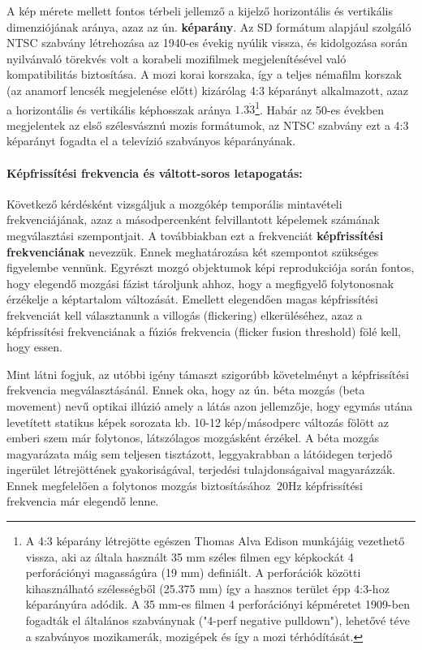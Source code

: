 A kép mérete mellett fontos térbeli jellemző a kijelző horizontális és vertikális dimenziójának aránya, azaz az ún. \textbf{képarány}.
Az SD formátum alapjául szolgáló NTSC szabvány létrehozása az 1940-es évekig nyúlik vissza, és kidolgozása során nyilvánvaló törekvés volt a korabeli mozifilmek megjelenítésével való kompatibilitás biztosítása.
A mozi korai korszaka, így a teljes némafilm korszak (az anamorf lencsék megjelenése előtt) kizárólag 4:3 képarányt alkalmazott, azaz a horizontális és vertikális képhosszak aránya $1.3\dot{3}$\footnote{A 4:3 képarány létrejötte egészen Thomas Alva Edison munkájáig vezethető vissza, aki az általa használt 35 mm széles filmen egy képkockát 4 perforációnyi magasságúra (19 mm) definiált. 
A perforációk közötti kihasználható szélességből (25.375 mm) így a hasznos terület épp 4:3-hoz képarányúra adódik. 
A 35 mm-es filmen 4 perforációnyi képméretet 1909-ben fogadták el általános szabványnak ("4-perf negative pulldown"), lehetővé téve a szabványos mozikamerák, mozigépek és így a mozi térhódítását.}.
Habár az 50-es években megjelentek az első szélesvásznú mozis formátumok, az NTSC szabvány ezt a 4:3 képarányt fogadta el a televízió szabványos képarányának.

\paragraph{Képfrissítési frekvencia és váltott-soros letapogatás:\\}

Következő kérdésként vizsgáljuk a mozgókép temporális mintavételi frekvenciájának, azaz a másodpercenként felvillantott képelemek számának megválasztási szempontjait.
A továbbiakban ezt a frekvenciát \textbf{képfrissítési frekvenciának} nevezzük.
Ennek meghatározása két szempontot szükséges figyelembe vennünk.
Egyrészt mozgó objektumok képi reprodukciója során fontos, hogy elegendő mozgási fázist tároljunk ahhoz, hogy a megfigyelő folytonosnak érzékelje a képtartalom változását.
Emellett elegendően magas képfrissítési frekvenciát kell választanunk a villogás (flickering) elkerüléséhez, azaz a képfrissítési frekvenciának a fúziós frekvencia (flicker fusion threshold) fölé kell, hogy essen.

Mint látni fogjuk, az utóbbi igény támaszt szigorúbb követelményt a képfrissítési frekvencia megválasztásánál.
Ennek oka, hogy az ún. béta mozgás (beta movement) nevű optikai illúzió amely a látás azon jellemzője, hogy egymás utána levetített statikus képek sorozata kb. 10-12 kép/másodperc változás fölött az emberi szem már folytonos, látszólagos mozgásként érzékel.
A béta mozgás magyarázata máig sem teljesen tisztázott, leggyakrabban a látóidegen terjedő ingerület létrejöttének gyakoriságával, terjedési tulajdonságaival magyarázzák.
Ennek megfelelően a folytonos mozgás biztosításához $~20 \mathrm{Hz}$ képfrissítési frekvencia már elegendő lenne.





